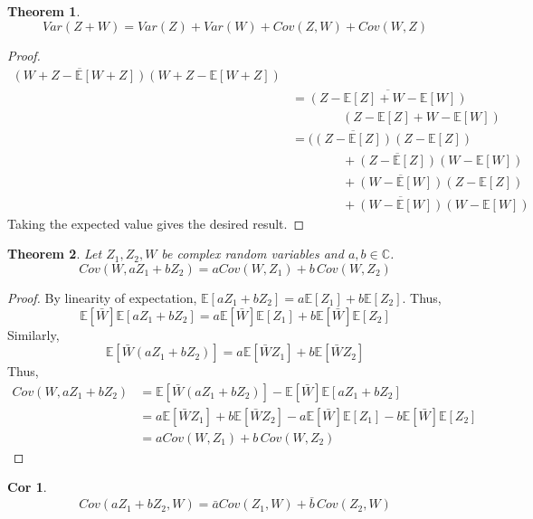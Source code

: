 \documentclass{article}
\newtheorem{theorem}{Theorem}
\theoremstyle{definition}\newtheorem{definition}{DEF}
\theoremstyle{lemma}\newtheorem{lemma}{Lemma}
\theoremstyle{corrolary}\newtheorem{corrolary}{Cor}
\begin{document}
\begin{theorem}
\begin{equation}
Var(Z + W) = Var(Z) + Var(W) + Cov(Z,W) + Cov(W,Z)
\end{equation}
\end{theorem}
\begin{proof}
\begin{align*}
\overline{(W + Z - \mathbb{E}[W + Z])}(W + Z - \mathbb{E}[W + Z]) \\
&=\overline{(Z - \mathbb{E}[Z] + W - \mathbb{E}[W])} \\
&\quad \quad \quad \quad (Z - \mathbb{E}[Z] + W - \mathbb{E}[W]) \\
&= (\overline{(Z - \mathbb{E}[Z])}(Z - \mathbb{E}[Z]) \\
&\quad \quad \quad \quad + \overline{(Z - \mathbb{E}[Z])}(W - \mathbb{E}[W]) \\
&\quad \quad \quad \quad + \overline{(W - \mathbb{E}[W])}(Z - \mathbb{E}[Z]) \\
&\quad \quad \quad \quad + \overline{(W - \mathbb{E}[W])}(W - \mathbb{E}[W])
\end{align*}
Taking the expected value gives the desired result.
\end{proof}

\begin{theorem}
Let $Z_1, Z_2, W$ be complex random variables and $a,b\in \mathbb{C}$.
\begin{equation}
Cov(W, aZ_1 + bZ_2) = a Cov(W, Z_1) + b\, Cov(W, Z_2)
\end{equation}
\end{theorem}
\begin{proof}
By linearity of expectation, $\mathbb{E}[aZ_1 + bZ_2] = a\mathbb{E}[Z_1] + b\mathbb{E}[Z_2]$.
Thus,
\begin{equation*}
\mathbb{E}[\bar{W}]\mathbb{E}[aZ_1 + bZ_2] = a\mathbb{E}[\bar{W}]\mathbb{E}[Z_1] + b\mathbb{E}[\bar{W}]\mathbb{E}[Z_2]
\end{equation*}
Similarly,
\begin{equation*}
\mathbb{E}[\bar{W}(aZ_1 + bZ_2)] = a\mathbb{E}[\bar{W}Z_1] + b\mathbb{E}[\bar{W}Z_2]
\end{equation*}
Thus,
\begin{align*}
Cov(W, aZ_1 + bZ_2)
&=\mathbb{E}[\bar{W}(aZ_1 + bZ_2)] - \mathbb{E}[\bar{W}]\mathbb{E}[aZ_1 + bZ_2] \\
&= a\mathbb{E}[\bar{W}Z_1] + b\mathbb{E}[\bar{W}Z_2] -a\mathbb{E}[\bar{W}]\mathbb{E}[Z_1] - b\mathbb{E}[\bar{W}]\mathbb{E}[Z_2]\\
&=aCov(W,Z_1) + b\, Cov(W, Z_2)
\end{align*}
\end{proof}
\begin{corrolary}
\begin{equation}
Cov(aZ_1 + bZ_2, W) = \bar{a}Cov(Z_1, W) + \bar{b}\, Cov(Z_2, W)
\end{equation}
\end{corrolary}
\end{document}
